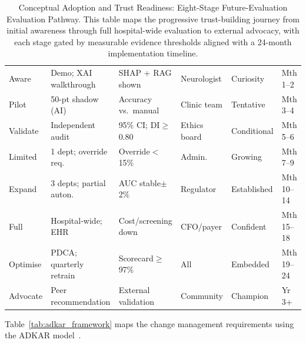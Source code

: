 \begin{table}[!htbp]
\tablestripes\tablefontsize
\caption[Conceptual Adoption and Trust Readiness: Eight-Stage Future-Evaluation]{Conceptual Adoption and Trust Readiness: Eight-Stage Future-Evaluation Evaluation Pathway. This table maps the progressive trust-building journey from initial awareness through full hospital-wide evaluation to external advocacy, with each stage gated by measurable evidence thresholds aligned with a 24-month implementation timeline.}
\tablefontsize
\begin{tabularx}{\textwidth}{@{} >{\raggedright\arraybackslash}p{1.1cm} L L L L >{\raggedright\arraybackslash}p{1.0cm} @{}}
\toprule
{} &  &  &  &  &  \\
\midrule
Aware & Demo; XAI walkthrough & SHAP + RAG shown & Neurologist & Curiosity & Mth 1--2 \\
\addlinespace
Pilot & 50-pt shadow (AI) & Accuracy vs.\ manual & Clinic team & Tentative & Mth 3--4 \\
\addlinespace
Validate & Independent audit & 95\% CI; DI$\geq$0.80 & Ethics board & Conditional & Mth 5--6 \\
\addlinespace
Limited & 1 dept; override req. & Override$<$15\% & Admin. & Growing & Mth 7--9 \\
\addlinespace
Expand & 3 depts; partial auton. & AUC stable$\pm$2\% & Regulator & Established & Mth 10--14 \\
\addlinespace
Full & Hospital-wide; EHR & Cost/screening down & CFO/payer & Confident & Mth 15--18 \\
\addlinespace
Optimise & PDCA; quarterly retrain & Scorecard$\geq$97\% & All & Embedded & Mth 19--24 \\
\addlinespace
Advocate & Peer recommendation & External validation & Community & Champion & Yr 3+ \\
\bottomrule
\end{tabularx}
\end{table}

Table~\ref{tab:adkar_framework} maps the change management requirements using the ADKAR model~\cite{hiatt2006adkar}.

